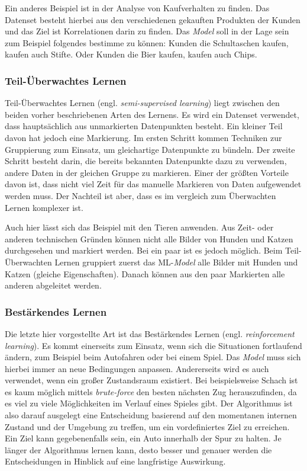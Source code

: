 Ein anderes Beispiel ist in der Analyse von Kaufverhalten zu finden. Das Datenset besteht hierbei aus den verschiedenen gekauften Produkten der Kunden und das Ziel ist Korrelationen darin zu finden. Das \textit{Model} soll in der Lage sein zum Beispiel folgendes bestimme zu können: Kunden die Schultaschen kaufen, kaufen auch Stifte. Oder Kunden die Bier kaufen, kaufen auch Chips.

\subsubsection{Teil-Überwachtes Lernen}
Teil-Überwachtes Lernen (engl. \textit{semi-supervised learning}) liegt zwischen den beiden vorher beschriebenen Arten des Lernens. Es wird ein Datenset verwendet, dass hauptsächlich aus unmarkierten Datenpunkten besteht. Ein kleiner Teil davon hat jedoch eine Markierung. Im ersten Schritt kommen Techniken zur Gruppierung zum Einsatz, um gleichartige Datenpunkte zu bündeln. Der zweite Schritt besteht darin, die bereits bekannten Datenpunkte dazu zu verwenden, andere Daten in der gleichen Gruppe zu markieren. Einer der größten Vorteile davon ist, dass nicht viel Zeit für das manuelle Markieren von Daten aufgewendet werden muss. Der Nachteil ist aber, dass es im vergleich zum Überwachten Lernen komplexer ist.

Auch hier lässt sich das Beispiel mit den Tieren anwenden. Aus Zeit- oder anderen technischen Gründen können nicht alle Bilder von Hunden und Katzen durchgesehen und markiert werden. Bei ein paar ist es jedoch möglich. Beim Teil-Überwachten Lernen gruppiert zuerst das ML-\textit{Model} alle Bilder mit Hunden und Katzen (gleiche Eigenschaften). Danach können aus den paar Markierten alle anderen abgeleitet werden.

\subsubsection{Bestärkendes Lernen}
Die letzte hier vorgestellte Art ist das Bestärkendes Lernen (engl. \textit{reinforcement learning}). Es kommt einerseits zum Einsatz, wenn sich die Situationen fortlaufend ändern, zum Beispiel beim Autofahren oder bei einem Spiel. Das \textit{Model} muss sich hierbei immer an neue Bedingungen anpassen. Andererseits wird es auch verwendet, wenn ein großer Zustandsraum existiert. Bei beispielsweise Schach ist es kaum möglich mittels \textit{brute-force} den besten nächsten Zug herauszufinden, da es viel zu viele Möglichkeiten im Verlauf eines Spieles gibt. Der Algorithmus ist also darauf ausgelegt eine Entscheidung basierend auf den momentanen internen Zustand und der Umgebung zu treffen, um ein vordefiniertes Ziel zu erreichen. Ein Ziel kann gegebenenfalls sein, ein Auto innerhalb der Spur zu halten. Je länger der Algorithmus lernen kann, desto besser und genauer werden die Entscheidungen in Hinblick auf eine langfristige Auswirkung.

